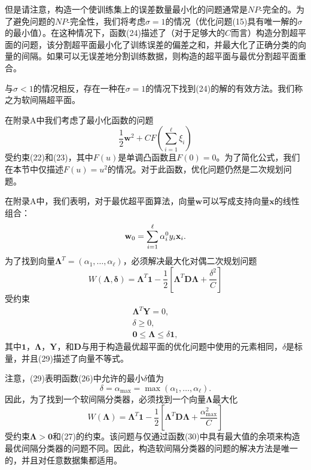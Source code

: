 \documentclass[lang=cn,11pt,a4paper]{elegantpaper}
\begin{document}
	但是请注意，构造一个使训练集上的误差数量最小化的问题通常是$NP$-完全的。为了避免问题的$NP$-完全性，我们将考虑$\sigma=1$的情况（优化问题(15)具有唯一解的$\sigma$的最小值）。在这种情况下，函数(24)描述了（对于足够大的$C$而言）构造分割超平面的问题，该分割超平面最小化了训练误差的偏差之和，并最大化了正确分类的向量的间隔。如果可以无误差地分割训练数据，则构造的超平面与最优分割超平面重合。

	与$\sigma<1$的情况相反，存在一种在$\sigma=1$的情况下找到(24)的解的有效方法。我们称之为软间隔超平面。

	在附录A中我们考虑了最小化函数的问题
	\begin{equation}
		\frac{1}{2}\mathbf{w}^2+CF\left(\sum_{i=1}^{\ell}\xi_i\right)\tag{25}
	\end{equation}
	受约束(22)和(23)，其中$F(u)$是单调凸函数且$F(0)=0$。为了简化公式，我们在本节中仅描述$F(u)=u^2$的情况。对于此函数，优化问题仍然是二次规划问题。

	在附录A中，我们表明，对于最优超平面算法，向量$\mathbf{w}$可以写成支持向量$\mathbf{x}$的线性组合：
	\begin{equation}
		\mathbf{w}_0=\sum_{i=1}^{\ell}\alpha_i^0y_i\mathbf{x}_i.\notag
	\end{equation}
	为了找到向量$\mathbf{\Lambda}^T=(\alpha_1,\dots,\alpha_{\ell})$，必须解决最大化对偶二次规划问题
	\begin{equation}
		W(\mathbf{\Lambda,\delta})=\mathbf{\Lambda}^T\mathbf{1}-\frac{1}{2}\left[\mathbf{\Lambda}^T\mathbf{D\Lambda}+\frac{\delta^2}{C}\right]\tag{26}
	\end{equation}
	受约束
	\begin{align}
		\mathbf{\Lambda}^T\mathbf{Y}=0,\tag{27} \\
		\delta\geq0,\tag{28} \\
		\mathbf{0}\leq\mathbf{\Lambda}\leq\delta\mathbf{1},\tag{29}
	\end{align}
	其中$\mathbf{1}$，$\mathbf{\Lambda}$，$\mathbf{Y}$，和$\mathbf{D}$与用于构造最优超平面的优化问题中使用的元素相同，$\delta$是标量，并且(29)描述了向量不等式。

	注意，(29)表明函数(26)中允许的最小$\delta$值为
	\begin{equation}
		\delta=\alpha_\mathrm{max}=\max(\alpha_1,\dots,\alpha_{\ell}).\tag{30}
	\end{equation}
	因此，为了找到一个软间隔分类器，必须找到一个向量$\mathbf{\Lambda}$最大化
	\begin{equation}
		W(\mathbf{\Lambda})=\mathbf{\Lambda}^T\mathbf{1}-\frac{1}{2}\left[\mathbf{\Lambda}^T\mathbf{D\Lambda}+\frac{\alpha_{\mathrm{max}}^2}{C}\right]\tag{30}
	\end{equation}
	受约束$\mathbf{\Lambda}>\mathbf{0}$和(27)的约束。该问题与仅通过函数(30)中具有最大值的余项来构造最优间隔分类器的问题不同。因此，构造软间隔分类器的问题的解决方法是唯一的，并且对任意数据集都适用。
\end{document}
